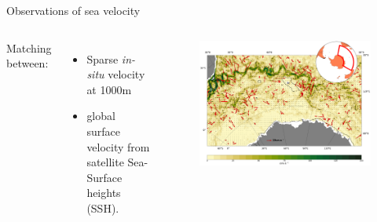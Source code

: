 \documentclass[handout]{beamer}
\begin{document}
\begin{frame}{Observations of sea velocity}
    \begin{columns}
   \pause
    Matching between:
    \begin{itemize}
        \item Sparse \textit{in-situ} velocity at 1000m
        \item global surface velocity from satellite Sea-Surface heights (SSH).
    \end{itemize}
    \begin{figure}
         \includegraphics[width=\textwidth]{fig/L3/Surface_Currents_Kerguelen_Intro_resized_v2.pdf}
    \end{figure}
    
    \end{columns}
    \end{frame}
    
\end{document}
